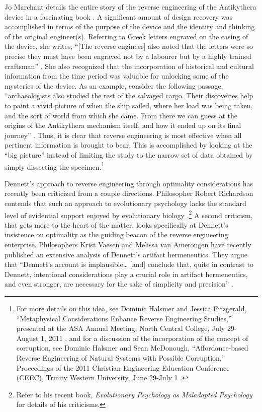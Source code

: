 Jo Marchant details the entire story of the reverse engineering of the
Antikythera device in a fascinating book \citep{marchant2009}. A
significant amount of design recovery was accomplished in terms of the
purpose of the device and the identity and thinking of the original
engineer(s). Referring to Greek letters engraved on the casing of the
device, she writes, “[The reverse engineer] also noted that the letters
were so precise they must have been engraved not by a labourer but by a
highly trained craftsman” \citep[][p.~55]{marchant2009}. She also recognized that
the incorporation of historical and cultural information from the time
period was valuable for unlocking some of the mysteries of the device.
As an example, consider the following passage, “archaeologists also
studied the rest of the salvaged cargo. Their discoveries help to paint
a vivid picture of when the ship sailed, where her load was being
taken, and the sort of world from which she came. From there we can
guess at the origins of the Antikythera mechanism itself, and how it
ended up on its final journey” \citep[][p.~61]{marchant2009}. Thus, it is clear
that reverse engineering is most effective when all pertinent
information is brought to bear. This is accomplished by looking at the
“big picture” instead of limiting the study to the narrow set of data
obtained by simply dissecting the specimen.\footnote{
For more details on this idea, see Dominic Halsmer
and Jessica Fitzgerald, ``Metaphysical Considerations Enhance Reverse
Engineering Studies,'' presented at the ASA Annual Meeting, North
Central College, July 29-August 1, 2011 \citep{halsmerfitzgerald2011}, and for a discussion of the
incorporation of the concept of corruption, see Dominic Halsmer and
Sean McDonough, ``Affordance-based Reverse Engineering of Natural
Systems with Possible Corruption,'' Proceedings of the 2011 Christian
Engineering Education Conference (CEEC), Trinity Western University,
June 29-July 1 \citep{halsmermcdonough2011}.
}

Dennett’s approach to reverse engineering through optimality
considerations has recently been criticized from a couple directions.
Philosopher Robert Richardson contends that such an approach to
evolutionary psychology lacks the standard level of evidential support
enjoyed by evolutionary biology \citep{richardson2007}.\footnote{Refer to his recent
book, \textit{Evolutionary Psychology as Maladapted Psychology} \citep{richardson2007} for details of his 
criticisms.} A second
criticism, that gets more to the heart of the matter, looks
specifically at Dennett’s insistence on optimality as the guiding
beacon of the reverse engineering enterprise. Philosophers Krist Vaesen
and Melissa van Amerongen have recently published an extensive analysis
of Dennett’s artifact hermeneutics. They argue that “Dennett’s account
is implausible{\ldots} [and] conclude that, quite in contrast to Dennett,
intentional considerations play a crucial role in artifact
hermeneutics, and even stronger, are necessary for the sake of
simplicity and precision” \citep[][p.~779]{vaesenamerongen2008}.

